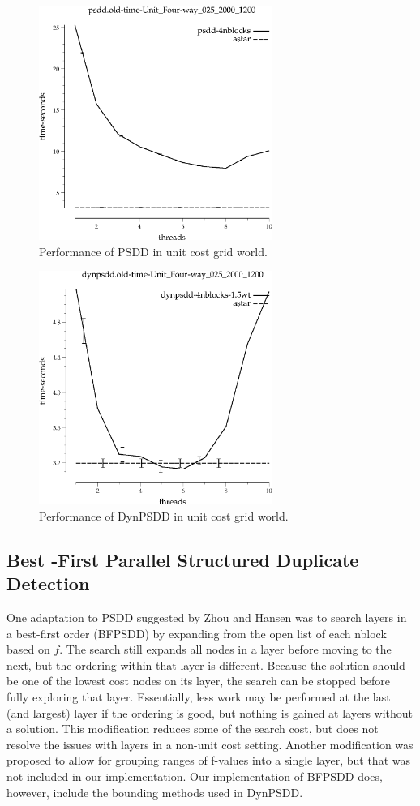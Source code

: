 \documentclass{article}
\begin{document}
\begin{figure}[h!]
\includegraphics[width=3in]{../graphs/seth/grid-unit-single/PSDD.eps}
\caption{Performance of PSDD in unit cost grid world.}
\label{fig:PSDD-grid}
\end{figure}

\begin{figure}[h!]
\includegraphics[width=3in]{../graphs/seth/grid-unit-single/DynPSDD.eps}
\caption{Performance of DynPSDD in unit cost grid world.}
\label{fig:DynPSDD-grid}
\end{figure}
\subsection{Best -First Parallel Structured Duplicate Detection}
One adaptation to PSDD \cite{zhou:sdd} suggested by Zhou and Hansen was to search layers in a best-first order (BFPSDD) by expanding from the open list of each nblock based on $f$. The search still expands all nodes in a layer before moving to the next, but the ordering within that layer is different. Because the solution should be one of the lowest cost nodes on its layer, the search can be stopped before fully exploring that layer. Essentially, less work may be performed at the last (and largest) layer if the ordering is good, but nothing is gained at layers without a solution. This modification reduces some of the search cost, but does not resolve the issues with layers in a non-unit cost setting. Another modification was proposed to allow for grouping ranges of f-values into a single layer, but that was not included in our implementation. Our implementation of BFPSDD does, however, include the bounding methods used in DynPSDD.
\end{document}
